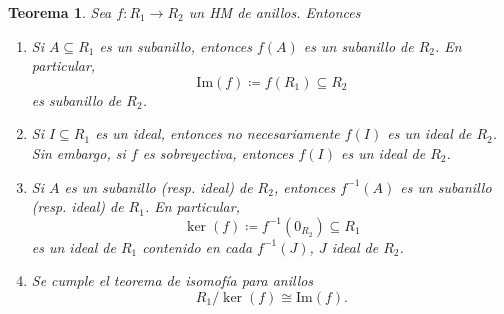 \documentclass[11pt]{book}
\def\Im{\mathrm{Im}}
\newtheorem{theorem}{Teorema}[section]
\theoremstyle{definition}
\begin{document}
\begin{theorem}
    Sea $f:R_1\longrightarrow R_2$ un HM de anillos. Entonces\begin{enumerate}
        \item Si $A\subseteq R_1$ es un subanillo, entonces $f(A)$ es un subanillo de $R_2$. En particular,\[
        \Im(f)\coloneq f(R_1)\subseteq R_2
        \]es subanillo de $R_2$.
        \item Si $I\subseteq R_1$ es un ideal, entonces no necesariamente $f(I)$ es un ideal de $R_2$. Sin embargo, si $f$ es sobreyectiva, entonces $f(I)$ es un ideal de $R_2$.
        \item Si $A$ es un subanillo (resp. ideal) de $R_2$, entonces $f^{-1}(A)$ es un subanillo (resp. ideal) de $R_1$. En particular,\[
        \ker(f)\coloneq f^{-1}(0_{R_2})\subseteq R_1
        \]es un ideal de $R_1$ contenido en cada $f^{-1}(J)$, $J$ ideal de $R_2$.
        \item Se cumple el \textit{teorema de isomofía} para anillos\[
        R_1/\ker(f)\cong \Im(f).
        \]
    \end{enumerate}
\end{theorem}
\end{document}
